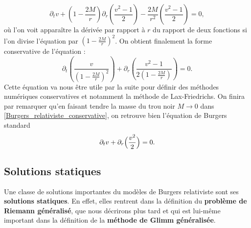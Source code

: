 \documentclass[11pt,a4paper]{article}
\begin{document}
\begin{equation}
	\partial_t v + \left(1 - \frac{2M}{r}\right)\partial_r\left(\frac{v^2-1}{2}\right) - \frac{2M}{r^2}\left(\frac{v^2 -1}{2}\right) = 0,
\end{equation}
où l'on voit apparaître la dérivée par rapport à $r$ du rapport de deux fonctions si l'on divise l'équation par $\left(1-\frac{2M}{r}\right)^2$. On obtient finalement la forme conservative de l'équation :
\begin{equation}\label{Burgers_relativiste_conservative}
	\partial_t \left(\frac{v}{(1-\frac{2M}{r})^2}\right) + \partial_r\left(\frac{v^2-1}{2\left(1-\frac{2M}{r}\right)}\right) = 0.
\end{equation}
Cette équation va nous être utile par la suite pour définir des méthodes numériques conservatives et notamment la méthode de Lax-Friedrichs.
On finira par remarquer qu'en faisant tendre la masse du trou noir $M \to 0$ dans \eqref{Burgers_relativiste_conservative}, on retrouve bien l'équation de Burgers standard 
\begin{equation}\label{standard}
\partial_t v+  \partial_r  \Big({ v^2\over2 } \Big)=0. 
\end{equation}

\subsection{Solutions statiques}

Une classe de solutions importantes du modèles de Burgers relativiste sont ses \textbf{solutions statiques}. En effet, elles rentrent dans la définition du \textbf{problème de Riemann généralisé}, que nous décrirons plus tard et qui est lui-même important dans la définition de la \textbf{méthode de Glimm généralisée}.
\end{document}
